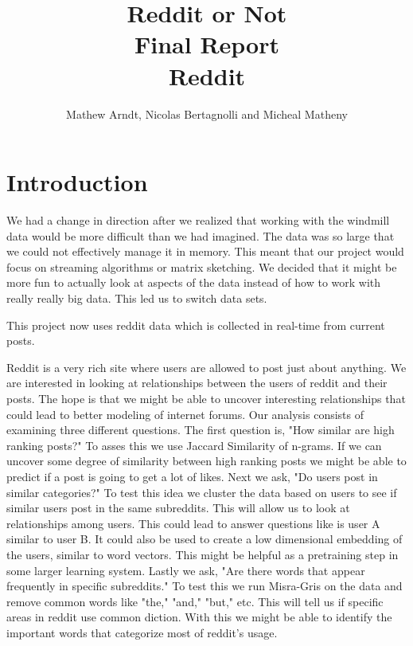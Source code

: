 \documentclass[12pt]{article}
\numberwithin{equation}{section}
\begin{document}
\title{Reddit or Not\\ Final Report \\ Reddit }
\author{Mathew Arndt, Nicolas Bertagnolli and Micheal Matheny}
\date{}
\maketitle
{}
\newpage
  
\section*{Introduction}
		We had a change in direction after we realized that working with the windmill data would  be more difficult than we had imagined.  The data was so large that we could not effectively manage it in memory. This meant that our project would focus on streaming algorithms or matrix sketching.  We decided that it might be more fun to actually look at aspects of the data instead of how to work with really really big data.  This led us to switch data sets.  \newline

		This project now uses reddit data which is collected in real-time from current posts.  \newline
		
		Reddit is a very rich site where users are allowed to post just about anything.  We are interested in looking at relationships between the users of reddit and their posts.  The hope is that we might be able to uncover interesting relationships that could lead to better modeling of internet forums.  Our analysis consists of examining three different questions. The first question is, "How similar are high ranking posts?"  To asses this we use Jaccard Similarity of n-grams.  If we can uncover some degree of similarity between high ranking posts we might be able to predict if a post is going to get a lot of likes. Next we ask, "Do users post in similar categories?"  To test this idea we cluster the data based on users to see if similar users post in the same subreddits.  This will allow us to look at relationships among users.  This could lead to answer questions like is user A similar to user B.  It could also be used to create a low dimensional embedding of the users, similar to word vectors.  This might be helpful as a pretraining step in some larger learning system. Lastly we ask, "Are there words that appear frequently in specific subreddits." To test this we run Misra-Gris on the data and remove common words like "the," "and," "but," etc.  This will tell us if specific areas in reddit use common diction.  With this we might be able to identify the important words that categorize most of reddit's usage.
		
\end{document}

